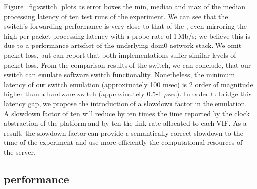 Figure~\ref{fig:switch} plots as error boxes the min, median and max of the
median processing latency of ten test runs of the experiment. We can see that
the \mirage switch's forwarding performance is very close to that of the \ovs,
even mirroring the high per-packet processing latency with a probe rate of
1\,Mb/s; we believe this is due to a performance artefact of the underlying dom0
network stack. We omit packet loss, but can report that both implementations
suffer similar levels of packet loss.  From the comparison results of the
\mirage \of switch, we can conclude, that our \of switch can emulate software
switch functionality. Nonetheless, the minimum latency of our switch emulation
(approximately 100 msec) is 2 order of magnitude higher than a hardware switch
(approximately 0.5-1 $\mu$sec). In order to bridge this latency gap, we propose
the introduction of a slowdown factor in the emulation.  A slowdown factor of
ten will reduce by ten times the time reported by the clock abstraction of the
\mirage platform and by ten the link rate allocated to each VIF\@. As a result,
the slowdown factor can provide a semantically correct slowdown to the time of
the experiment and use more efficiently the computational resources of the
server. 

\subsection{ performance} \label{sec:sdnsim-ns3-perf}

